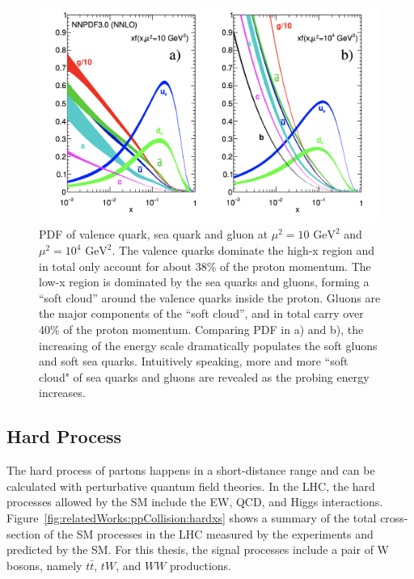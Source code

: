 \begin{figure}[ht]
    \centering
    \includegraphics[width = 0.7 \textwidth]{chapters/RelatedWorks/sectionPPCollision/figures/pdf.png}
    \caption{PDF of valence quark, sea quark and gluon at $\mu^2=10 \text{ GeV}^2$ and $\mu^2=10^4 \text{ GeV}^2$. The valence quarks dominate the high-x region and in total only account for about 38\% of the proton momentum. The low-x region is dominated by the sea quarks and gluons, forming a ``soft cloud'' around the valence quarks inside the proton. Gluons are the major components of the ``soft cloud'', and in total carry over 40\% of the proton momentum. Comparing PDF in a) and b), the increasing of the energy scale dramatically populates the soft gluons and soft sea quarks.  Intuitively speaking, more and more ``soft cloud" of sea quarks and gluons are revealed as the probing energy increases.}
    \label{fig:relatedWorks:ppCollision:pdf}
\end{figure}



\subsection{Hard Process}
\label{sec:relatedWorks:ppCollision:hardProcess} 


The hard process of partons happens in a short-distance range and can be calculated with perturbative quantum field theories. In the LHC, the hard processes allowed by the SM include the EW, QCD, and Higgs interactions. Figure~\ref{fig:relatedWorks:ppCollision:hardxs} shows a summary of the total cross-section of the SM processes in the LHC measured by the experiments and predicted by the SM. For this thesis, the signal processes include a pair of W bosons, namely $t\bar{t}$, $tW$, and $WW$ productions.




